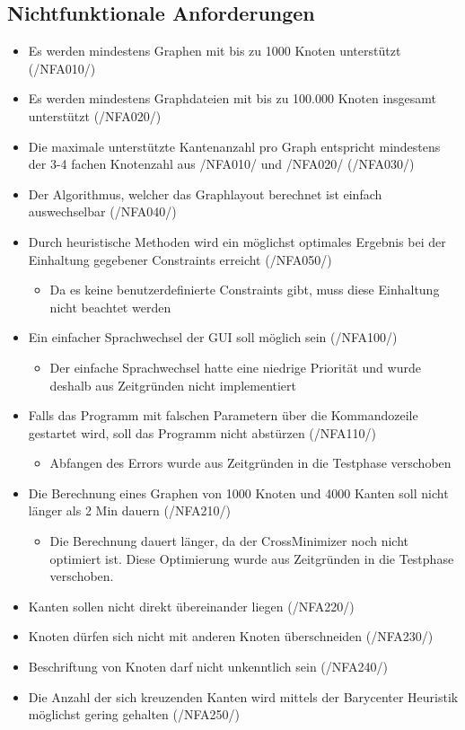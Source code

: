 \subsection{Nichtfunktionale Anforderungen}
\begin{itemize}
	\item Es werden mindestens Graphen mit bis zu 1000 Knoten unterstützt (/NFA010/)
	\item Es werden mindestens Graphdateien mit bis zu 100.000 Knoten insgesamt unterstützt (/NFA020/)
	\item Die maximale unterstützte Kantenanzahl pro Graph entspricht mindestens der 3-4 fachen Knotenzahl aus /NFA010/ und /NFA020/ (/NFA030/)
	\item Der Algorithmus, welcher das Graphlayout berechnet ist einfach auswechselbar (/NFA040/)
	\item Durch heuristische Methoden wird ein möglichst optimales Ergebnis bei der Einhaltung gegebener Constraints erreicht (/NFA050/)
		\begin{itemize}
			\item Da es keine benutzerdefinierte Constraints gibt, muss diese Einhaltung nicht beachtet werden
		\end{itemize}
	\item Ein einfacher Sprachwechsel der GUI soll möglich sein (/NFA100/)
		\begin{itemize}
			\item Der einfache Sprachwechsel hatte eine niedrige Priorität und wurde deshalb aus Zeitgründen nicht implementiert
		\end{itemize}
	\item Falls das Programm mit falschen Parametern über die Kommandozeile gestartet wird, soll das Programm nicht abstürzen (/NFA110/)
		\begin{itemize}
			\item Abfangen des Errors wurde aus Zeitgründen in die Testphase verschoben
		\end{itemize}
	\item Die Berechnung eines Graphen von 1000 Knoten und 4000 Kanten soll nicht länger als 2 Min dauern (/NFA210/)
		\begin{itemize}
			\item Die Berechnung dauert länger, da der CrossMinimizer noch nicht optimiert ist. Diese Optimierung wurde aus Zeitgründen in die Testphase verschoben.
		\end{itemize}
	\item Kanten sollen nicht direkt übereinander liegen (/NFA220/)
	\item Knoten dürfen sich nicht mit anderen Knoten überschneiden (/NFA230/)
	\item Beschriftung von Knoten darf nicht unkenntlich sein (/NFA240/)
	\item Die Anzahl der sich kreuzenden Kanten wird mittels der Barycenter Heuristik möglichst gering gehalten (/NFA250/)
\end{itemize}


